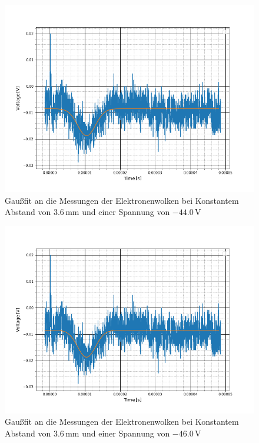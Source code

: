 \begin{figure}
	\includegraphics[scale=0.5]{Bild/A1}
	\centering
	\caption[Gaußfit an Messung bei Konst. Abstand]{Gaußfit an die Messungen der Elektronenwolken bei Konstantem Abstand von $3.6$\,mm und einer Spannung von $-44.0$\,V}
\end{figure}
\begin{figure}
	\includegraphics[scale=0.5]{Bild/A1}
	\centering
	\caption[Gaußfit an Messung bei Konst. Abstand]{Gaußfit an die Messungen der Elektronenwolken bei Konstantem Abstand von $3.6$\,mm und einer Spannung von $-46.0$\,V}
\end{figure}
